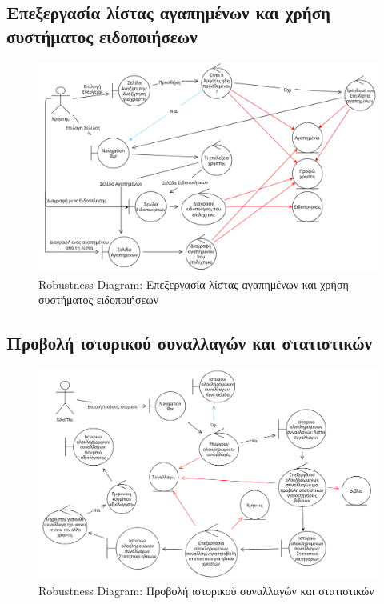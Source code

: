 \documentclass[12pt,a4paper]{article}
\begin{document}
\subsection{Επεξεργασία λίστας αγαπημένων και χρήση συστήματος ειδοποιήσεων}
\begin{figure}[H]
	\includegraphics[width=\textwidth]{Favorite Users and Notification System Robustness.png}
	\caption{Robustness Diagram: Επεξεργασία λίστας αγαπημένων και χρήση συστήματος ειδοποιήσεων}
	\label{Robustness Diagram: Επεξεργασία λίστας αγαπημένων και χρήση συστήματος ειδοποιήσεων}
\end{figure}

\subsection{Προβολή ιστορικού συναλλαγών και στατιστικών}
\begin{figure}[H]
	\includegraphics[width=\textwidth]{History and Statistics Robustness.png}
	\caption{Robustness Diagram: Προβολή ιστορικού συναλλαγών και στατιστικών}
	\label{Robustness Diagram: Προβολή ιστορικού συναλλαγών και στατιστικών}
\end{figure}
\end{document}
